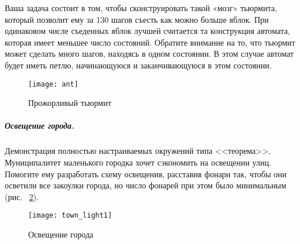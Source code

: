 Ваша  задача состоит в том, чтобы сконструировать  такой «мозг» тьюрмита, который позволит ему за 130 шагов съесть как можно больше яблок. При одинаковом числе съеденных яблок лучшей считается та конструкция автомата, которая имеет меньшее число состояний. Обратите внимание на то, что тьюрмит может сделать много шагов, находясь в одном состоянии. В этом случае автомат будет иметь петлю, начинающуюся и заканчивающуюся в этом состоянии.
\begin{figure}[!ht]
	\begin{center}
		\texttt{[image: ant]}
	\end{center}
	\caption{Прожорливый тьюрмит}
	\label{ant}
\end{figure}


\subparagraph{Освещение города.}
Демонстрация полностью настраиваемых окружений типа <<теорема>>.
Муниципалитет маленького городка хочет сэкономить на освещении улиц. Помогите ему разработать схему освещения, расставив фонари так, чтобы они осветили все закоулки города, но число фонарей при этом было минимальным (рис. ~\ref{town_light1}).
\begin{figure}[!ht]
	\begin{center}
		\texttt{[image: town\_light1]}
	\end{center}
	\caption{Освещение города}
	\label{town_light1}
\end{figure}

